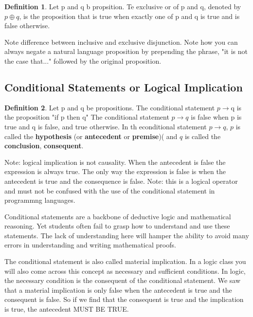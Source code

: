 \documentclass[11pt]{book} %
\theoremstyle {definition}
\newtheorem {definition}{Definition}[section]
\theoremstyle {remark}
\begin{document}
\begin {definition}
Let p and q b propsition. Te exclusive or of p and q, denoted by $p \oplus q$, is the proposition that is true when exactly one of p and q is true and is false otherwise.
\end {definition}

Note difference between inclusive and exclusive disjunction.
Note how you can always negate a natural language proposition by prepending the phrase, "it is not the case that..." followed by the original proposition.

    \subsection {Conditional Statements or Logical Implication}

\begin {definition}
Let p and q be propositions. The conditional statement $p \rightarrow $q is the proposition "if p then q" The conditional statement $p \rightarrow q$ is false when p is true and q is false, and true otherwise. In th econditional statement  $p \rightarrow q$, $p$ is called the \textbf{hypothesis} (or \textbf{antecedent} or \textbf{premise})( and $q$ is called the \textbf{conclusion}, \textbf{consequent}.  
\end {definition}

Note: logical implication is not causality. When the antecedent is false the expression is always true. The only way the expression is false is when the antecedent is true and the consequence is false. 
Note: this is a logical operator and must not be confused with the use of the conditional statement in programmng languages.

Conditional statements are a backbone of deductive logic and mathematical reasoning. Yet students often fail to grasp how to understand and use these statements. The lack of understanding here will hamper the ability to avoid many errors in understanding and writing mathematical proofs. 

The conditional statement is also called material implication. In a logic class you will also come across this concept as necessary and sufficient conditions. In logic, the necessary condition is the consequent of the conditional statement. We saw that a material implication is only false when the antecedent is true and the consequent is false. So if we find that the consequent is true and the implication is true, the antecedent MUST BE TRUE. 
\end{document}
